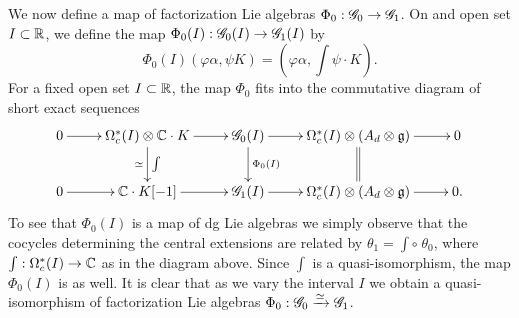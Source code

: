 \documentclass[10pt]{amsart}
\begin{document}
We now define a map of factorization Lie algebras $\Phi_0 : \mathscr G_0 \to \mathscr G_1$. On and open set $I \subset \mathbb R$, we define the map $\Phi_0(I) : \mathscr G_0(I) \to \mathscr G_1(I)$ by
\[
\Phi_0(I)(\varphi \alpha, \psi K) = \left(\varphi \alpha, \int \psi \cdot K\right) .
\]
For a fixed open set $I \subset \mathbb R$, the map $\Phi_0$ fits into the commutative diagram of short exact sequences
\[
\xymatrix{
0 \ar[r] & \Omega^*_c(I) \tensor \CC \cdot K  \ar[d]^-{\int}_-{\simeq} \ar[r] & \sG_0(I) \ar[d]^-{\Phi_0(I)} \ar[r] & \Omega^*_c(I) \tensor (A_d \tensor \fg) \ar@{=}[d] \ar[r] & 0 \\
0 \ar[r] & \CC \cdot K [-1] \ar[r] & \sG_1(I) \ar[r] & \Omega^*_c(I) \tensor (A_d \tensor \fg) \ar[r] & 0 .
}
\]
To see that $\Phi_0(I)$ is a map of dg Lie algebras we simply observe that the cocycles determining the central extensions are related by $\theta_1 = \int \circ \; \theta_0$, where $\int : \Omega^*_c(I) \to \mathbb C$ as in the diagram above. Since $\int$ is a quasi-isomorphism, the map $\Phi_0(I)$ is as well. It is clear that as we vary the interval $I$ we obtain a quasi-isomorphism of factorization Lie algebras $\Phi_0 : \mathscr G_0 \xrightarrow{\simeq} \mathscr G_1$. 

\end{document}
